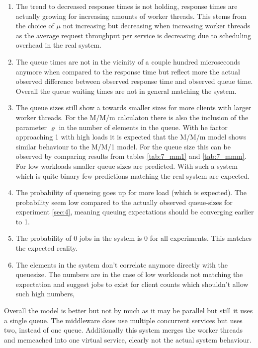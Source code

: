         \begin{enumerate}
            \item The trend to decreased response times is not holding, response times are actually growing for
                  increasing amounts of worker threads. This stems from the choice of $\mu$ not increasing but
                  decreasing when increasing worker threads as the average request throughput per service is decreasing
                  due to scheduling overhead in the real system.
            \item The queue times are not in the vicinity of a couple hundred microseconds anymore when compared to the
                  response time but reflect more the actual observed difference between observed response time and
                  observed queue time. Overall the queue waiting times are not in general matching the system.
            \item The queue sizes still show a towards smaller sizes for more clients with larger worker threads. For
                  the M/M/m calculaton there is also the inclusion of the parameter $\varrho$ in the number of elements in
                  the queue. With he factor approaching 1 with high loads it is expected that the M/M/m model shows
                  similar behaviour to the M/M/1 model. For the queue size this can be observed by comparing results from
                  tables \ref{tab:7_mm1} and \ref{tab:7_mmm}. For low workloads smaller queue sizes are predicted. With
                  such a system which is quite binary few predictions matching the real system are expected.
            \item The probability of queueing goes up for more load (which is expected). The probability seem low
                  compared to the actually observed queue-sizes for experiment \ref{sec:4}, meaning queuing expectations
                  should be converging earlier to 1.
            \item The probability of 0 jobs in the system is 0 for all experiments. This matches the expected reality.
            \item The elements in the system don't correlate anymore directly with the queuesize. The numbers are in the
                  case of low workloads not matching the expectation and suggest jobs to exist for client counts which
                  shouldn't allow such high numbers,
        \end{enumerate}

        Overall the model is better but not by much as it may be parallel but still it uses a single queue. The
        middleware does use multiple concurrent services but uses two, instead of one queue. Additionally this system
        merges the worker threads and memcached into one virtual service, clearly not the actual system behaviour.

